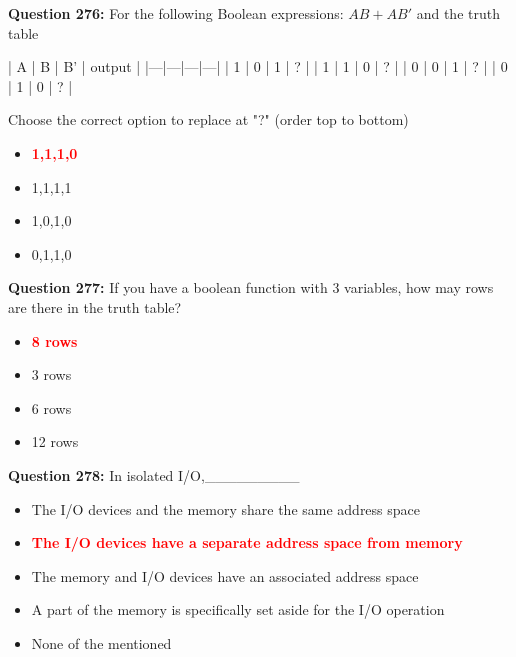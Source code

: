 \documentclass[12pt,a4paper]{article}
\begin{document}
\textbf{Question 276:} For the following Boolean expressions: $AB + AB'$ and the truth table

| A | B | B' | output |
|---|---|---|---|
| 1 | 0 | 1 | ? |
| 1 | 1 | 0 | ? |
| 0 | 0 | 1 | ? |
| 0 | 1 | 0 | ? |

Choose the correct option to replace at "?" (order top to bottom)

\begin{itemize}
    \item[\textbf{A.}] \textcolor{red}{\textbf{1,1,1,0}}
    \item[\textbf{B.}] 1,1,1,1
    \item[\textbf{C.}] 1,0,1,0
    \item[\textbf{D.}] 0,1,1,0
\end{itemize}

\vspace{0.5cm}

\textbf{Question 277:} If you have a boolean function with 3 variables, how may rows are there in the truth table?

\begin{itemize}
    \item[\textbf{A.}] \textcolor{red}{\textbf{8 rows}}
    \item[\textbf{B.}] 3 rows
    \item[\textbf{C.}] 6 rows
    \item[\textbf{D.}] 12 rows
\end{itemize}

\vspace{0.5cm}

\textbf{Question 278:} In isolated I/O,_________

\begin{itemize}
    \item[\textbf{A.}] The I/O devices and the memory share the same address space
    \item[\textbf{B.}] \textcolor{red}{\textbf{The I/O devices have a separate address space from memory}}
    \item[\textbf{C.}] The memory and I/O devices have an associated address space
    \item[\textbf{D.}] A part of the memory is specifically set aside for the I/O operation
    \item[\textbf{E.}] None of the mentioned
\end{itemize}

\vspace{0.5cm}
\end{document}
